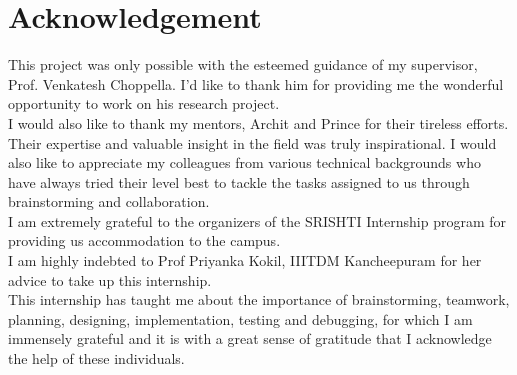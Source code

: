 \cleardoublepage
\sectionfont{\fontsize{18}{15}\selectfont}
\section*{Acknowledgement}
This project was only possible with the esteemed guidance of my supervisor, Prof. Venkatesh Choppella. I'd like to thank him for providing me the wonderful opportunity to work on his research project. \\[0.1in] 
I would also like to thank my mentors, Archit and Prince for their tireless efforts. Their expertise and valuable insight in the field was truly inspirational. 
I would also like to appreciate my colleagues from various technical backgrounds who have always tried their level best to tackle the tasks assigned to us through brainstorming and collaboration. \\[0.1in]
I am extremely grateful to the organizers of the SRISHTI Internship program for providing us accommodation to the campus.\\[0.1in]
I am highly indebted to Prof Priyanka Kokil, IIITDM Kancheepuram for her advice to take up this internship.\\[0.1in]  
This internship has taught me about the importance of brainstorming, teamwork, planning, designing, implementation, testing and debugging, for which I am immensely grateful and it is with a great sense of gratitude that I acknowledge the help of these individuals.  